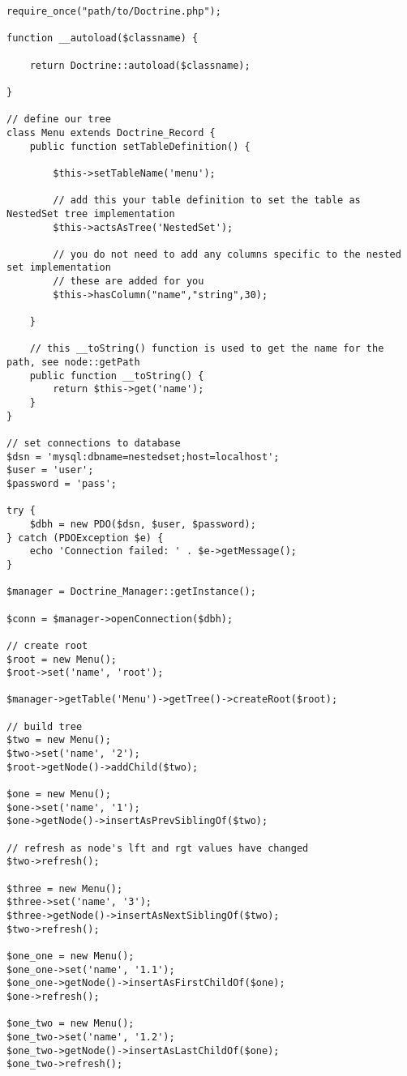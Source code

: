 \documentclass[11pt,a4paper]{report}
\begin{document}
\begin{verbatim}
require_once("path/to/Doctrine.php");

function __autoload($classname) {

    return Doctrine::autoload($classname);

}

// define our tree
class Menu extends Doctrine_Record {
    public function setTableDefinition() {

        $this->setTableName('menu');

        // add this your table definition to set the table as NestedSet tree implementation
        $this->actsAsTree('NestedSet');

        // you do not need to add any columns specific to the nested set implementation
        // these are added for you
        $this->hasColumn("name","string",30);

    }

    // this __toString() function is used to get the name for the path, see node::getPath
    public function __toString() {
        return $this->get('name');
    }
}

// set connections to database
$dsn = 'mysql:dbname=nestedset;host=localhost';
$user = 'user';
$password = 'pass';

try {
    $dbh = new PDO($dsn, $user, $password);
} catch (PDOException $e) {
    echo 'Connection failed: ' . $e->getMessage();
}

$manager = Doctrine_Manager::getInstance();

$conn = $manager->openConnection($dbh);

// create root
$root = new Menu();
$root->set('name', 'root');

$manager->getTable('Menu')->getTree()->createRoot($root);

// build tree
$two = new Menu();
$two->set('name', '2');
$root->getNode()->addChild($two);

$one = new Menu();
$one->set('name', '1');
$one->getNode()->insertAsPrevSiblingOf($two);

// refresh as node's lft and rgt values have changed
$two->refresh();

$three = new Menu();
$three->set('name', '3');
$three->getNode()->insertAsNextSiblingOf($two);
$two->refresh();

$one_one = new Menu();
$one_one->set('name', '1.1');
$one_one->getNode()->insertAsFirstChildOf($one);
$one->refresh();

$one_two = new Menu();
$one_two->set('name', '1.2');
$one_two->getNode()->insertAsLastChildOf($one);
$one_two->refresh();


\end{verbatim}
\end{document}
